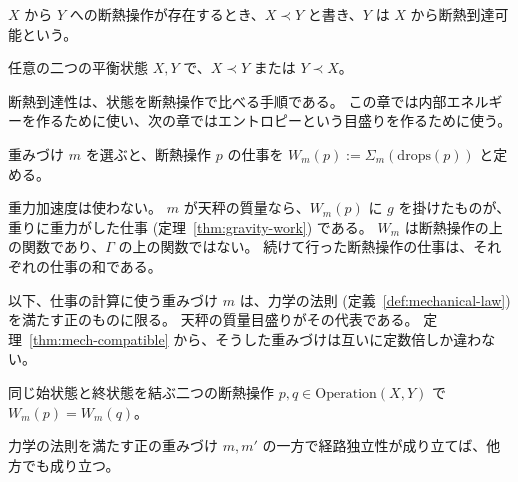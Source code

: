 \begin{definition}[断熱到達性]
  \label{def:prec}
  \leanok
  $X$ から $Y$ への断熱操作が存在するとき、$X \prec Y$ と書き、$Y$ は $X$ から断熱到達可能という。
\end{definition}

\begin{empirical}[連結性]
  \label{emp:connected}
  \leanok
  任意の二つの平衡状態 $X, Y$ で、$X \prec Y$ または $Y \prec X$。
\end{empirical}

断熱到達性は、状態を断熱操作で比べる手順である。
この章では内部エネルギーを作るために使い、次の章ではエントロピーという目盛りを作るために使う。

\begin{definition}[仕事]
  \label{def:work}
  \leanok
  重みづけ $m$ を選ぶと、断熱操作 $p$ の仕事を $W_m(p) := \Sigma_m(\mathrm{drops}(p))$ と定める。
\end{definition}

重力加速度は使わない。
$m$ が天秤の質量なら、$W_m(p)$ に $g$ を掛けたものが、重りに重力がした仕事 (定理~\ref{thm:gravity-work}) である。
$W_m$ は断熱操作の上の関数であり、$\Gamma$ の上の関数ではない。
続けて行った断熱操作の仕事は、それぞれの仕事の和である。

以下、仕事の計算に使う重みづけ $m$ は、力学の法則 (定義~\ref{def:mechanical-law}) を満たす正のものに限る。
天秤の質量目盛りがその代表である。
定理~\ref{thm:mech-compatible} から、そうした重みづけは互いに定数倍しか違わない。

\begin{empirical}
  \label{emp:path-indep}
  \leanok
  同じ始状態と終状態を結ぶ二つの断熱操作 $p, q \in \mathrm{Operation}(X, Y)$ で $W_m(p) = W_m(q)$。
\end{empirical}

\begin{theorem}[重みづけの選び方によらない]
  \label{thm:path-compatible}
  \leanok
  力学の法則を満たす正の重みづけ $m, m'$ の一方で経路独立性が成り立てば、他方でも成り立つ。
\end{theorem}

